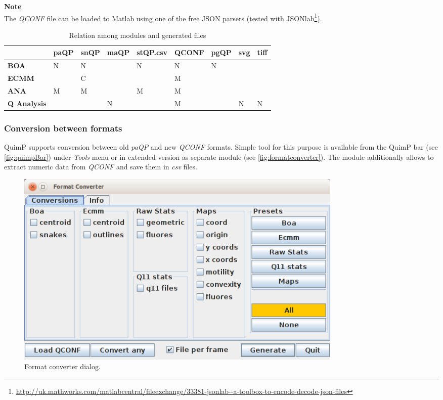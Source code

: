 \documentclass[a4paper,12pt]{article}
\begin{document}
\textbf{Note} \\
The \textit{QCONF} file can be loaded to Matlab using one of the free JSON parsers (tested with JSONlab\footnote{\url{http://uk.mathworks.com/matlabcentral/fileexchange/33381-jsonlab--a-toolbox-to-encode-decode-json-files}}).

\begin{table}[h]
	\centering
	\caption{Relation among modules and generated files}
	\label{filestable}
	\begin{tabular}{|l|l|l|l|l|l|l|l|l|}
		&  \textbf{paQP}&  \textbf{snQP}&  \textbf{maQP}&  \textbf{stQP.csv}&  \textbf{QCONF}&  \textbf{pgQP}& \textbf{svg}&  \textbf{tiff}\\ \hline
		\textbf{BOA} &   N&  N&  &  N&  N&  N&  &  \\
		\textbf{ECMM}&    &  C&  &   &  M&   &  &  \\
		\textbf{ANA} &   M&  M&  &  M&  M&   &  &  \\
		\textbf{Q Analysis}&  &  &  N&  &  M&  &  N& N 
	\end{tabular}
\end{table}


\subsubsection{Conversion between formats}
\label{sec:ConversionBetweenFormats}
QuimP supports conversion between old \textit{paQP} and new \textit{QCONF} formats. Simple tool for this purpose is available from the QuimP bar (see \autoref{fig:quimpBar}) under \textit{Tools} menu or in extended version as separate module (see \autoref{fig:formatconverter}). The module additionally allows to extract numeric data from \textit{QCONF} and save them in \textit{csv} files.

\begin{figure}[h]
	\centering
	\includegraphics[width=16cm]{fcWindow.png} 
	\caption{Format converter dialog.}
	\label{fig:formatconverter}
\end{figure}
\end{document}
